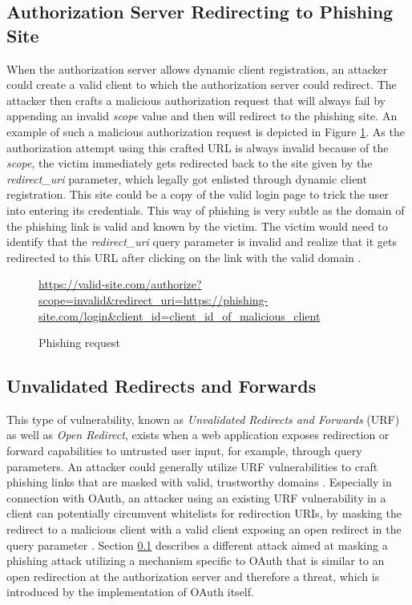 \documentclass[
    fontsize=12pt,
    headings=small,
    parskip=half,           %
    bibliography=totoc,
    numbers=noenddot,       %
    open=any,               %
    ]{scrreprt}
\begin{document}
\subsection{Authorization Server Redirecting to Phishing Site}
\label{sub:authorization_server_redirecting_to_phishing_site}
When the authorization server allows dynamic client registration, an attacker could create a valid client to which the authorization server could redirect. The attacker then crafts a malicious authorization request that will always fail by appending an invalid \emph{scope} value and then will redirect to the phishing site. An example of such a malicious authorization request is depicted in Figure \ref{fig:phishing_requests}. As the authorization attempt using this crafted URL is always invalid because of the \emph{scope}, the victim immediately gets redirected back to the site given by the \emph{redirect\_uri} parameter, which legally got enlisted through dynamic client registration. This site could be a copy of the valid login page to trick the user into entering its credentials. This way of phishing is very subtle as the domain of the phishing link is valid and known by the victim. The victim would need to identify that the \emph{redirect\_uri} query parameter is invalid and realize that it gets redirected to this URL after clicking on the link with the valid domain \cite{lodderstedt2020oauth}.


\begin{figure}[ht]
	\sffamily\footnotesize
	\url{https://valid-site.com/authorize?scope=invalid&redirect_uri=https://phishing-site.com/login&client_id=client_id_of_malicious_client}
	\linethickness{0.4pt}
	\caption{Phishing request}
	\label{fig:phishing_requests}
\end{figure}

\subsection{Unvalidated Redirects and Forwards}
This type of vulnerability, known as \emph{Unvalidated Redirects and Forwards} (URF) as well as \emph{Open Redirect}, exists when a web application exposes redirection or forward capabilities to untrusted user input, for example, through query parameters. An attacker could generally utilize URF vulnerabilities to craft phishing links that are masked with valid, trustworthy domains \cite{wang2015urfds}. Especially in connection with OAuth, an attacker using an existing URF vulnerability in a client can potentially circumvent whitelists for redirection URIs, by masking the redirect to a malicious client with a valid client exposing an open redirect in the query parameter \cite{lodderstedt2020oauth}. Section \ref{sub:authorization_server_redirecting_to_phishing_site} describes a different attack aimed at masking a phishing attack utilizing a mechanism specific to OAuth that is similar to an open redirection at the authorization server and therefore a threat, which is introduced by the implementation of OAuth itself.
\end{document}
